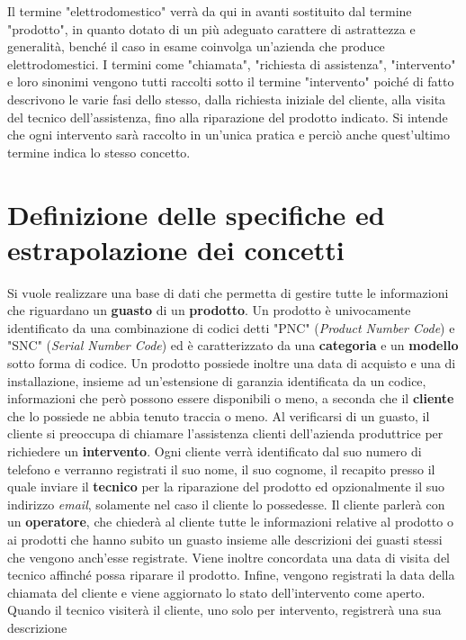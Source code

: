 \documentclass[a4paper, 12pt]{report}
\begin{document}
Il termine "elettrodomestico" verrà da qui in avanti sostituito dal termine "prodotto", in quanto dotato di un più adeguato carattere di astrattezza
e generalità, benché il caso in esame coinvolga un'azienda che produce elettrodomestici. I termini come "chiamata", "richiesta di
assistenza", "intervento" e loro sinonimi vengono tutti raccolti sotto il termine "intervento" poiché di fatto descrivono le varie fasi dello
stesso, dalla richiesta iniziale del cliente, alla visita del tecnico dell'assistenza, fino alla riparazione del prodotto indicato. Si intende
che ogni intervento sarà raccolto in un'unica pratica e perciò anche quest'ultimo termine indica lo stesso concetto.

\section{Definizione delle specifiche ed estrapolazione dei concetti}
Si vuole realizzare una base di dati che permetta di gestire tutte le informazioni che riguardano un \textbf{guasto} di un \textbf{prodotto}.
Un prodotto è univocamente identificato da una combinazione di codici detti "PNC" (\textit{Product Number Code}) e "SNC" (\textit{Serial Number Code}) ed è caratterizzato
da una \textbf{categoria} e un \textbf{modello} sotto forma di codice. Un prodotto possiede inoltre una data di acquisto e una di installazione, insieme ad 
un'estensione di garanzia identificata da un codice, informazioni che però possono essere disponibili o meno, a seconda che il \textbf{cliente}
che lo possiede ne abbia tenuto traccia o meno.\newline
Al verificarsi di un guasto, il cliente si preoccupa di chiamare l'assistenza clienti dell'azienda produttrice per richiedere un
\textbf{intervento}. Ogni cliente verrà identificato dal suo numero di telefono e verranno registrati il suo nome, il suo cognome,
il recapito presso il quale inviare il \textbf{tecnico} per la riparazione del prodotto ed opzionalmente il suo indirizzo \textit{email},
solamente nel caso il cliente lo possedesse.\newline
Il cliente parlerà con un \textbf{operatore}, che chiederà al cliente tutte le informazioni relative al prodotto o ai prodotti
che hanno subito un guasto insieme alle descrizioni dei guasti stessi che vengono anch'esse registrate. Viene inoltre concordata una data di
visita del tecnico affinché possa riparare il prodotto. Infine, vengono registrati la data della chiamata del cliente e viene
aggiornato lo stato dell'intervento come aperto. Quando il tecnico visiterà il cliente, uno solo per intervento, registrerà una sua descrizione
\end{document}
